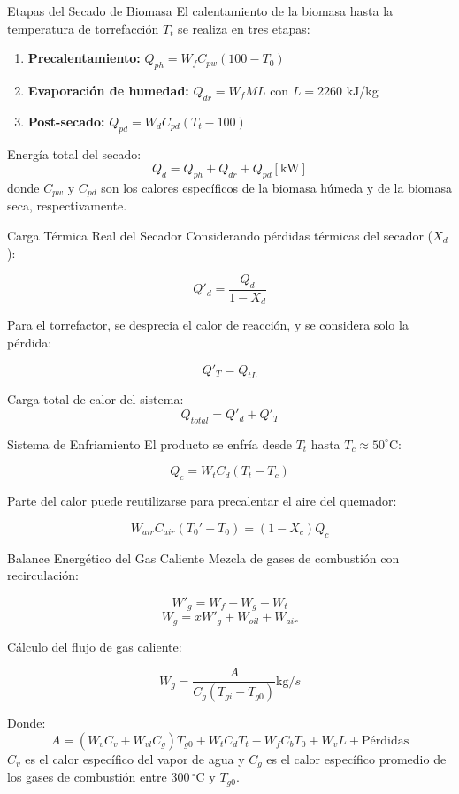 \documentclass[main.tex]{subfiles}
\begin{document}
\begin{frame}{Etapas del Secado de Biomasa}
  El calentamiento de la biomasa hasta la temperatura de torrefacción $T_t$ se realiza en tres etapas:

  \begin{enumerate}
    \item \textbf{Precalentamiento:} $Q_{ph} = W_f C_{pw}(100 - T_0)$
    \item \textbf{Evaporación de humedad:} $Q_{dr} = W_f M L$ con $L = 2260$ kJ/kg
    \item \textbf{Post-secado:} $Q_{pd} = W_d C_{pd}(T_t - 100)$
  \end{enumerate}

  Energía total del secado:
  \[
    Q_d = Q_{ph} + Q_{dr} + Q_{pd}  [ \si{\kilo\watt}]
  \]
  donde \( C_{pw} \) y \( C_{pd} \) son los calores específicos de la biomasa húmeda y de la biomasa seca, respectivamente.

\end{frame}

\begin{frame}{Carga Térmica Real del Secador}
  Considerando pérdidas térmicas del secador ($X_d$):

  \[
    Q'_d = \frac{Q_d}{1 - X_d}
  \]

  Para el torrefactor, se desprecia el calor de reacción, y se considera solo la pérdida:

  \[
    Q'_T = Q_{tL}
  \]

  Carga total de calor del sistema:
  \[
    Q_{total} = Q'_d + Q'_T
  \]
\end{frame}

\begin{frame}{Sistema de Enfriamiento}
  El producto se enfría desde $T_t$ hasta $T_c \approx 50^\circ$C:

  \[
    Q_c = W_t C_d (T_t - T_c)
  \]

  Parte del calor puede reutilizarse para precalentar el aire del quemador:

  \[
    W_{air} C_{air} (T_0' - T_0) = (1 - X_c) Q_c
  \]
\end{frame}

\begin{frame}{Balance Energético del Gas Caliente}
  Mezcla de gases de combustión con recirculación:

  \[
    W'_g = W_f + W_g - W_t
  \]
  \[
    W_g = x W'_g + W_{oil} + W_{air}
  \]

  Cálculo del flujo de gas caliente:

  \[
    W_g = \frac{A}{C_g (T_{gi} - T_{g0})}  \si{\kilogram/s}
  \]

  Donde:
  \[
    A = (W_v C_v + W_{vl} C_g)T_{g0} + W_t C_d T_t - W_f C_b T_0 + W_v L + \text{Pérdidas}
  \]
  \( C_v \) es el calor específico del vapor de agua y \( C_g \) es el calor específico promedio de los gases de combustión entre \( 300\,^\circ\mathrm{C} \) y \( T_{g0} \).

\end{frame}
\end{document}
